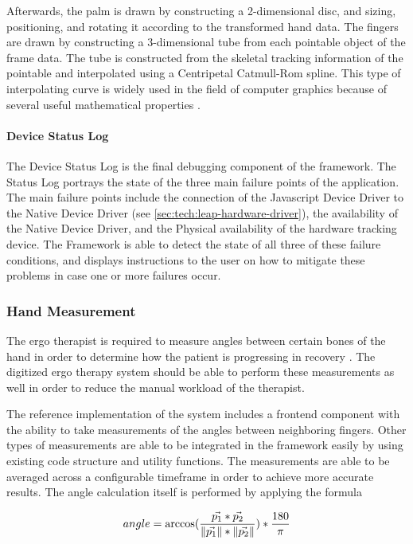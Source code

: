 Afterwards, the palm is drawn by constructing a 2-dimensional disc, and sizing, positioning, and rotating it according to the transformed hand data. The fingers are drawn by constructing a 3-dimensional tube from each pointable object of the frame data. The tube is constructed from the skeletal tracking information of the pointable and interpolated using a Centripetal Catmull-Rom spline. This type of interpolating curve is widely used in the field of computer graphics because of several useful mathematical properties \cite{Yuksel2011}.

\paragraph*{Device Status Log}
The Device Status Log is the final debugging component of the framework. The Status Log portrays the state of the three main failure points of the application. The main failure points include the connection of the Javascript Device Driver to the Native Device Driver (see \ref{sec:tech:leap-hardware-driver}), the availability of the Native Device Driver, and the Physical availability of the hardware tracking device. The Framework is able to detect the state of all three of these failure conditions, and displays instructions to the user on how to mitigate these problems in case one or more failures occur.

\subsubsection{Hand Measurement}
The ergo therapist is required to measure angles between certain bones of the hand in order to determine how the patient is progressing in recovery \cite[sec. 4.1.6]{StudiArbeitVolzBaumotte}. The digitized ergo therapy system should be able to perform these measurements as well in order to reduce the manual workload of the therapist.

The reference implementation of the system includes a frontend component with the ability to take measurements of the angles between neighboring fingers. Other types of measurements are able to be integrated in the framework easily by using existing code structure and utility functions. The measurements are able to be averaged across a configurable timeframe in order to achieve more accurate results. The angle calculation itself is performed by applying the formula

\begin{equation}
angle = \arccos(\dfrac{\vec{p_1} * \vec{p_2}}{\left\lVert\vec{p_1}\right\rVert * \left\lVert\vec{p_2}\right\rVert}) * \dfrac{180}{\pi}
\end{equation}

